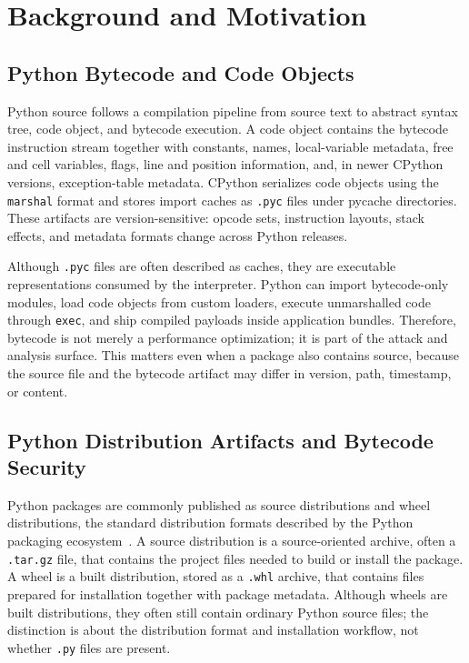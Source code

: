 \section{Background and Motivation}\label{sec:background}

\subsection{Python Bytecode and Code Objects}

Python source follows a compilation pipeline from source text to abstract syntax tree, code object, and bytecode execution.  A code object contains the bytecode instruction stream together with constants, names, local-variable metadata, free and cell variables, flags, line and position information, and, in newer CPython versions, exception-table metadata.  CPython serializes code objects using the \texttt{marshal} format and stores import caches as \texttt{.pyc} files under pycache directories.  These artifacts are version-sensitive: opcode sets, instruction layouts, stack effects, and metadata formats change across Python releases.

Although \texttt{.pyc} files are often described as caches, they are executable representations consumed by the interpreter.  Python can import bytecode-only modules, load code objects from custom loaders, execute unmarshalled code through \texttt{exec}, and ship compiled payloads inside application bundles.  Therefore, bytecode is not merely a performance optimization; it is part of the attack and analysis surface.  This matters even when a package also contains source, because the source file and the bytecode artifact may differ in version, path, timestamp, or content.

\subsection{Python Distribution Artifacts and Bytecode Security}

Python packages are commonly published as source distributions and wheel distributions, the standard distribution formats described by the Python packaging ecosystem~\cite{python-packaging-flow,python-package-formats}.  A source distribution is a source-oriented archive, often a \texttt{.tar.gz} file, that contains the project files needed to build or install the package.  A wheel is a built distribution, stored as a \texttt{.whl} archive, that contains files prepared for installation together with package metadata.  Although wheels are built distributions, they often still contain ordinary Python source files; the distinction is about the distribution format and installation workflow, not whether \texttt{.py} files are present.


